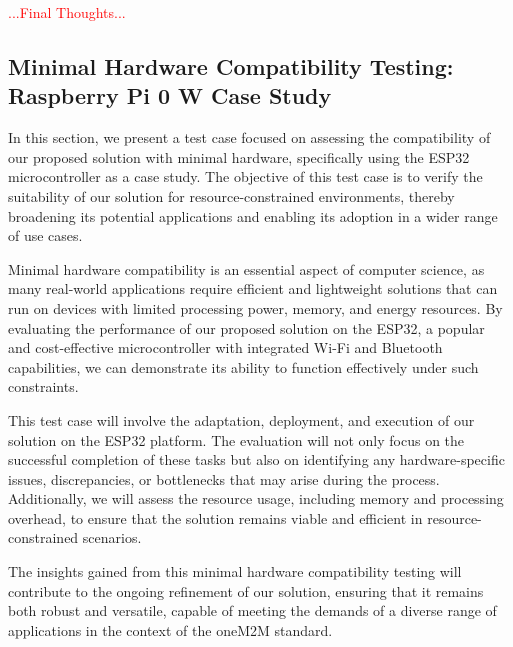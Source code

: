 \documentclass[a4paper,fleqn]{cas-dc}
\begin{document}
\textcolor{red}{...Final Thoughts...}

\subsection{Minimal Hardware Compatibility Testing: Raspberry Pi 0 W Case Study}

In this section, we present a test case focused on assessing the compatibility of our proposed solution with minimal hardware, specifically using the ESP32 microcontroller as a case study. The objective of this test case is to verify the suitability of our solution for resource-constrained environments, thereby broadening its potential applications and enabling its adoption in a wider range of use cases.

Minimal hardware compatibility is an essential aspect of computer science, as many real-world applications require efficient and lightweight solutions that can run on devices with limited processing power, memory, and energy resources. By evaluating the performance of our proposed solution on the ESP32, a popular and cost-effective microcontroller with integrated Wi-Fi and Bluetooth capabilities, we can demonstrate its ability to function effectively under such constraints.

This test case will involve the adaptation, deployment, and execution of our solution on the ESP32 platform. The evaluation will not only focus on the successful completion of these tasks but also on identifying any hardware-specific issues, discrepancies, or bottlenecks that may arise during the process. Additionally, we will assess the resource usage, including memory and processing overhead, to ensure that the solution remains viable and efficient in resource-constrained scenarios.

The insights gained from this minimal hardware compatibility testing will contribute to the ongoing refinement of our solution, ensuring that it remains both robust and versatile, capable of meeting the demands of a diverse range of applications in the context of the oneM2M standard.






%
%
%
%
%
%
\end{document}
